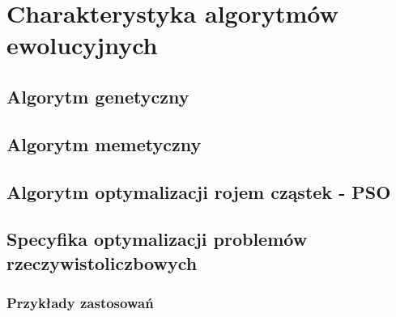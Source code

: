 \newpage
\chapter{Charakterystyka algorytmów ewolucyjnych}
\section{Algorytm genetyczny}

\section{Algorytm memetyczny}

\section{Algorytm optymalizacji rojem cząstek - PSO}

\section{Specyfika optymalizacji problemów rzeczywistoliczbowych}

\subsection{Przykłady zastosowań}